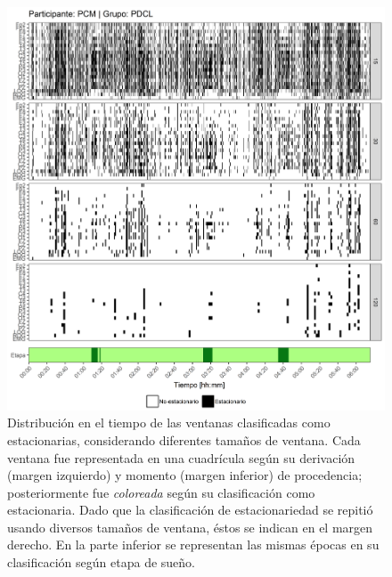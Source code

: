 \documentclass[12pt,letterpaper,draft]{book}
\begin{document}
\begin{figure}
\centering
\includegraphics[width=\linewidth]
{./scripts_graf_res/PCM_patrones_2.png}
\caption[Distribución en el tiempo de las ventanas clasificadas como estacionarias, considerando diferentes tamaños de ventana]{Distribución en el tiempo de las ventanas clasificadas como estacionarias, considerando diferentes tamaños de ventana. 
Cada ventana fue representada en una cuadrícula según su derivación (margen izquierdo) y momento (margen inferior) de procedencia; posteriormente fue \textit{coloreada} según su clasificación como estacionaria.
Dado que la clasificación de estacionariedad se repitió usando diversos tamaños de ventana, éstos se indican en el margen derecho.
En la parte inferior se representan las mismas épocas en su clasificación según etapa de sueño.}
\end{figure}

\end{document}
